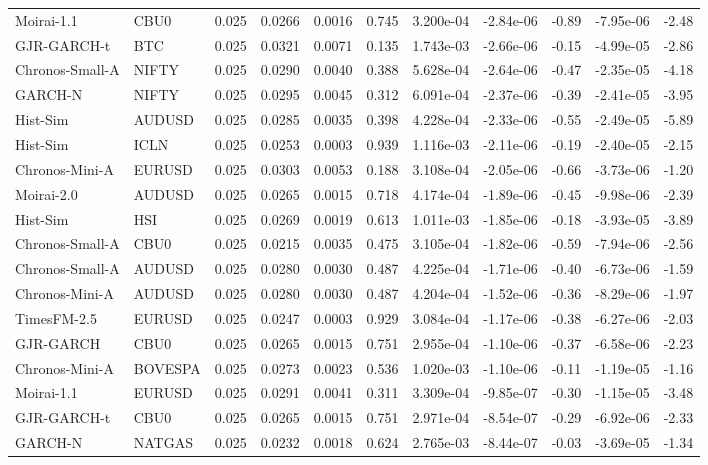 \begin{tabular}{llrrrrrrrrr}
Moirai-1.1 & CBU0 & 0.025 & 0.0266 & 0.0016 & 0.745 & 3.200e-04 & -2.84e-06 & -0.89 & -7.95e-06 & -2.48 \\
GJR-GARCH-t & BTC & 0.025 & 0.0321 & 0.0071 & 0.135 & 1.743e-03 & -2.66e-06 & -0.15 & -4.99e-05 & -2.86 \\
Chronos-Small-A & NIFTY & 0.025 & 0.0290 & 0.0040 & 0.388 & 5.628e-04 & -2.64e-06 & -0.47 & -2.35e-05 & -4.18 \\
GARCH-N & NIFTY & 0.025 & 0.0295 & 0.0045 & 0.312 & 6.091e-04 & -2.37e-06 & -0.39 & -2.41e-05 & -3.95 \\
Hist-Sim & AUDUSD & 0.025 & 0.0285 & 0.0035 & 0.398 & 4.228e-04 & -2.33e-06 & -0.55 & -2.49e-05 & -5.89 \\
Hist-Sim & ICLN & 0.025 & 0.0253 & 0.0003 & 0.939 & 1.116e-03 & -2.11e-06 & -0.19 & -2.40e-05 & -2.15 \\
Chronos-Mini-A & EURUSD & 0.025 & 0.0303 & 0.0053 & 0.188 & 3.108e-04 & -2.05e-06 & -0.66 & -3.73e-06 & -1.20 \\
Moirai-2.0 & AUDUSD & 0.025 & 0.0265 & 0.0015 & 0.718 & 4.174e-04 & -1.89e-06 & -0.45 & -9.98e-06 & -2.39 \\
Hist-Sim & HSI & 0.025 & 0.0269 & 0.0019 & 0.613 & 1.011e-03 & -1.85e-06 & -0.18 & -3.93e-05 & -3.89 \\
Chronos-Small-A & CBU0 & 0.025 & 0.0215 & 0.0035 & 0.475 & 3.105e-04 & -1.82e-06 & -0.59 & -7.94e-06 & -2.56 \\
Chronos-Small-A & AUDUSD & 0.025 & 0.0280 & 0.0030 & 0.487 & 4.225e-04 & -1.71e-06 & -0.40 & -6.73e-06 & -1.59 \\
Chronos-Mini-A & AUDUSD & 0.025 & 0.0280 & 0.0030 & 0.487 & 4.204e-04 & -1.52e-06 & -0.36 & -8.29e-06 & -1.97 \\
TimesFM-2.5 & EURUSD & 0.025 & 0.0247 & 0.0003 & 0.929 & 3.084e-04 & -1.17e-06 & -0.38 & -6.27e-06 & -2.03 \\
GJR-GARCH & CBU0 & 0.025 & 0.0265 & 0.0015 & 0.751 & 2.955e-04 & -1.10e-06 & -0.37 & -6.58e-06 & -2.23 \\
Chronos-Mini-A & BOVESPA & 0.025 & 0.0273 & 0.0023 & 0.536 & 1.020e-03 & -1.10e-06 & -0.11 & -1.19e-05 & -1.16 \\
Moirai-1.1 & EURUSD & 0.025 & 0.0291 & 0.0041 & 0.311 & 3.309e-04 & -9.85e-07 & -0.30 & -1.15e-05 & -3.48 \\
GJR-GARCH-t & CBU0 & 0.025 & 0.0265 & 0.0015 & 0.751 & 2.971e-04 & -8.54e-07 & -0.29 & -6.92e-06 & -2.33 \\
GARCH-N & NATGAS & 0.025 & 0.0232 & 0.0018 & 0.624 & 2.765e-03 & -8.44e-07 & -0.03 & -3.69e-05 & -1.34 \\

\end{tabular}
